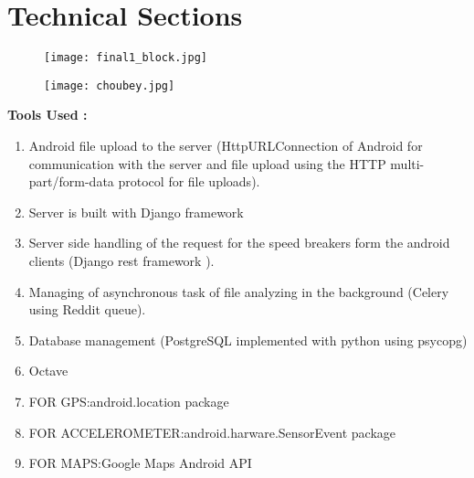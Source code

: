 \documentclass[12pt,twocolumn]{article}
\begin{document}
\section{Technical Sections}
\begin{figure}[ht!]
\centering
\texttt{[image: final1\_block.jpg]}
\end{figure} 
\begin{figure}[ht!]
\centering
\texttt{[image: choubey.jpg]}
\end{figure} 
\newpage
\textbf{Tools Used :}
\begin{enumerate}
\item Android file upload to the server (HttpURLConnection of Android for communication with the server and file upload using the HTTP multi-part/form-data protocol for file uploads).
\item Server is built with Django framework
\item Server side handling of the request for the speed breakers form the android clients (Django rest framework ).
\item Managing of asynchronous task of file analyzing in the background (Celery using Reddit queue).
\item Database management (PostgreSQL implemented with python using psycopg)
\item Octave
\item FOR GPS:android.location package 
\item FOR ACCELEROMETER:android.harware.SensorEvent	 					package
\item FOR MAPS:Google Maps Android API\\
\end{enumerate}
\end{document}
